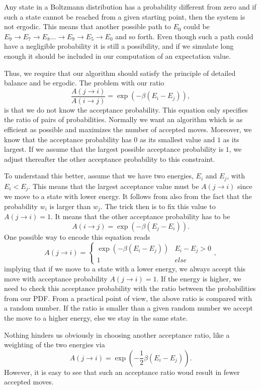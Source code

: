 Any state in a Boltzmann distribution has a probability different from zero and if such 
a state cannot be reached from a given starting point, then the system is not ergodic.
This means that another possible path to $E_0$ could be 
$E_9\rightarrow E_7 \rightarrow E_8 \dots \rightarrow E_9 \rightarrow E_5 \rightarrow E_0$ and so forth.
Even though such a path could have a negligible probability it is still a possibility, and if
we simulate long enough it should be included in our computation of an expectation value.

Thus, we require that our algorithm should satisfy the principle of detailed balance and be ergodic. 
The problem with our ratio
\[
\frac{A(j\rightarrow i)}{A(i\rightarrow j)}= \exp{(-\beta(E_i-E_j))}, 
\]
is that we do not know the acceptance probability. This equation only specifies the ratio of pairs of probabilities. Normally we want an algorithm which is as efficient as possible and maximizes the number of accepted moves. 
Moreover, we know that the acceptance probability has $0$ as its smallest value and $1$ as its largest. 
If we assume that the largest possible acceptance probability is $1$,  we adjust thereafter the other acceptance probability
to this constraint. 

To understand this better, assume that we have two energies, $E_i$ and $E_j$, with $E_i < E_j$. This means that the largest acceptance value must be 
$A(j\rightarrow i)$ since we move to a state with lower energy.  It follows from also from the fact that the probability $w_i$ is larger than $w_j$. 
The trick then is to fix this value to $A(j\rightarrow i)=1$. It means that 
the other acceptance probability has to be 
\[
A(i\rightarrow j)= \exp{(-\beta(E_j-E_i))}.
\]
One possible way to encode this equation reads
\[       
A(j\rightarrow i)=\left\{\begin{array}{cc}
\exp{(-\beta(E_i-E_j))} & E_i-E_j > 0 \\ 1 & else \end{array} \right.,  
\]
implying that if we move to a state with a lower energy, we always accept
this move with acceptance probability $A(j\rightarrow i)=1$. If the energy is higher, we need to check
this acceptance probability with the ratio between the probabilities  from our PDF.  From a practical point of view, 
the above ratio is compared with a random number.
If the ratio is smaller than a given random number we accept the move to a higher energy, else we stay in the same state. 

Nothing hinders us obviously in choosing another acceptance ratio, like a weighting  of the two energies via
\[
A(j\rightarrow i)=\exp{(-\frac{1}{2}\beta(E_i-E_j))}.
\]
However, it is easy to see that such an acceptance ratio woud result in 
fewer accepted moves.



